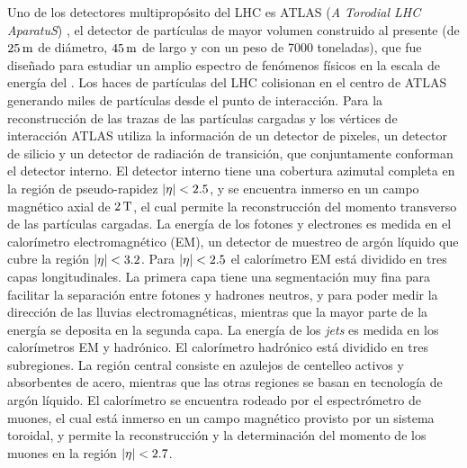 Uno de los detectores multipropósito del LHC es ATLAS (\emph{A Torodial LHC AparatuS})
\cite{atlas}, el detector de partículas de mayor volumen construido
al presente (de $\unit[25]{m}$ de diámetro, $\unit[45]{m}$ de largo y con un
peso de 7000 toneladas), que fue dise\~nado para estudiar un amplio espectro de
fenómenos físicos en la escala de energía del {\tev}.
Los haces de partículas del LHC colisionan en el centro de ATLAS generando miles
de partículas desde el punto de interacción.
Para la reconstrucción de las trazas de las partículas cargadas y los vértices
de interacción ATLAS utiliza la información de un detector de pixeles, un
detector de silicio y un detector de radiación de transición, que conjuntamente
conforman el detector interno. El detector interno tiene una cobertura azimutal
completa en la región de pseudo-rapidez $\abseta < 2.5$, y se encuentra inmerso
en un campo magnético axial de $\unit[2]{T}$, el cual permite la reconstrucción
del momento transverso de las partículas cargadas.
La energía de los fotones y electrones es medida en el calorímetro
electromagnético (EM), un detector de muestreo de argón líquido que cubre
la región $\abseta < 3.2$. Para $\abseta < 2.5$ el calorímetro EM está dividido en tres
capas longitudinales. La primera capa tiene una segmentación muy fina para
facilitar la separación entre fotones y hadrones neutros, y para poder medir la
dirección de las lluvias electromagnéticas, mientras que la mayor parte de la
energía se deposita en la segunda capa. La energía de
los \emph{jets} es medida en los calorímetros EM y hadrónico. El calorímetro
hadrónico está dividido en tres subregiones. La región central consiste en azulejos
de centelleo activos y absorbentes de acero, mientras que las otras regiones
se basan en tecnología de argón líquido.
El calorímetro se encuentra rodeado por el espectrómetro de muones, el cual está
inmerso en un campo magnético provisto por un sistema toroidal, y permite la reconstrucción
y la determinación del momento de los muones en la región $\abseta < 2.7$.

